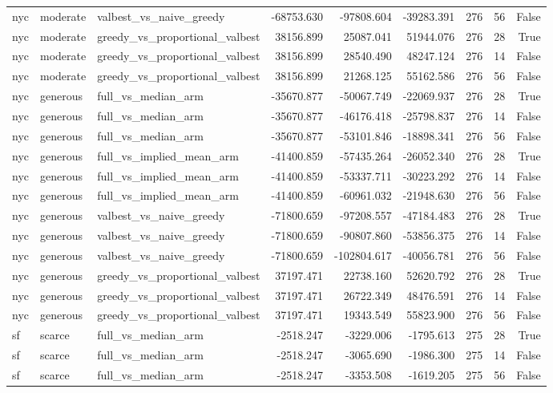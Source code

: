 \begin{tabular}{lllrrrrrr}
nyc & moderate & valbest\_vs\_naive\_greedy & -68753.630 & -97808.604 & -39283.391 & 276 & 56 & False \\
nyc & moderate & greedy\_vs\_proportional\_valbest & 38156.899 & 25087.041 & 51944.076 & 276 & 28 & True \\
nyc & moderate & greedy\_vs\_proportional\_valbest & 38156.899 & 28540.490 & 48247.124 & 276 & 14 & False \\
nyc & moderate & greedy\_vs\_proportional\_valbest & 38156.899 & 21268.125 & 55162.586 & 276 & 56 & False \\
nyc & generous & full\_vs\_median\_arm & -35670.877 & -50067.749 & -22069.937 & 276 & 28 & True \\
nyc & generous & full\_vs\_median\_arm & -35670.877 & -46176.418 & -25798.837 & 276 & 14 & False \\
nyc & generous & full\_vs\_median\_arm & -35670.877 & -53101.846 & -18898.341 & 276 & 56 & False \\
nyc & generous & full\_vs\_implied\_mean\_arm & -41400.859 & -57435.264 & -26052.340 & 276 & 28 & True \\
nyc & generous & full\_vs\_implied\_mean\_arm & -41400.859 & -53337.711 & -30223.292 & 276 & 14 & False \\
nyc & generous & full\_vs\_implied\_mean\_arm & -41400.859 & -60961.032 & -21948.630 & 276 & 56 & False \\
nyc & generous & valbest\_vs\_naive\_greedy & -71800.659 & -97208.557 & -47184.483 & 276 & 28 & True \\
nyc & generous & valbest\_vs\_naive\_greedy & -71800.659 & -90807.860 & -53856.375 & 276 & 14 & False \\
nyc & generous & valbest\_vs\_naive\_greedy & -71800.659 & -102804.617 & -40056.781 & 276 & 56 & False \\
nyc & generous & greedy\_vs\_proportional\_valbest & 37197.471 & 22738.160 & 52620.792 & 276 & 28 & True \\
nyc & generous & greedy\_vs\_proportional\_valbest & 37197.471 & 26722.349 & 48476.591 & 276 & 14 & False \\
nyc & generous & greedy\_vs\_proportional\_valbest & 37197.471 & 19343.549 & 55823.900 & 276 & 56 & False \\
sf & scarce & full\_vs\_median\_arm & -2518.247 & -3229.006 & -1795.613 & 275 & 28 & True \\
sf & scarce & full\_vs\_median\_arm & -2518.247 & -3065.690 & -1986.300 & 275 & 14 & False \\
sf & scarce & full\_vs\_median\_arm & -2518.247 & -3353.508 & -1619.205 & 275 & 56 & False \\

\end{tabular}

